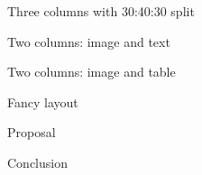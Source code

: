 \begin{frame}{Three columns with 30:40:30 split}
\label{three-columns-with-304030-split}
\end{frame}

\begin{frame}{Two columns: image and text}
\label{two-columns-image-and-text}
\end{frame}

\begin{frame}{Two columns: image and table}
\label{two-columns-image-and-table}
\end{frame}

\begin{frame}{Fancy layout}
\label{fancy-layout}
\begin{block}{Proposal}
\label{proposal}
\end{block}

\begin{block}{Conclusion}
\label{conclusion}
\end{block}
\end{frame}
